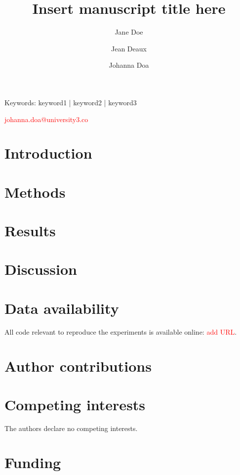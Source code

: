 
\title{Insert manuscript title here}

\author[1*]{Jane Doe}
\author[2*]{Jean Deaux}
\author[3 \Letter]{Johanna Doa}
\date{}

\titleblock{
\begin{@tmptwocolumnfalse}
\maketitle
\end{@tmptwocolumnfalse}

\begin{abstract}

\end{abstract}
}

\begin{keywords}
Keywords: keyword1 | keyword2 | keyword3
\end{keywords}

\begin{corrauthor}
\textcolor{red}{johanna.doa@university3.co}

\end{corrauthor}

\section*{Introduction}


\section*{Methods}


\section*{Results}


\section*{Discussion}


\section*{Data availability} \label{s:code_availability}
All code relevant to reproduce the experiments is available online: \textcolor{red}{add URL}.
\clearpage
\begin{refcontext}
    \printbibliography
\end{refcontext}

\section*{Author contributions}

\section*{Competing interests}
The authors declare no competing interests.

\section*{Funding}
\lipsum[25]
